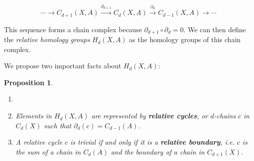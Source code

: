 \documentclass{amsart}
\newtheorem{proposition}[definition]{Proposition}
\begin{document}
\begin{equation}
\cdots \xrightarrow{} C_{d+1}(X,A) \xrightarrow{\partial_{d+1}} C_d(X,A) \xrightarrow{\partial_d} C_{d-1}(X,A) \rightarrow \cdots
\end{equation}

This sequence forms a chain complex because $\partial_{d+1}\circ\partial_{d} = 0$. We can then define the \emph{relative homology groups} $H_d(X,A)$ as the homology groups of this chain complex.

We propose two important facts about $H_d(X,A)$:

\begin{proposition}
\begin{enumerate}
	\item[]
	\item[1.] Elements in $H_d(X,A)$ are represented by \textbf{relative cycles}, or $d$-chains $c$ in $C_d(X)$ such that $\partial_d(c) = C_{d-1}(A)$.
	\item[2.] A relative cycle $c$ is trivial if and only if it is a \textbf{relative boundary}, i.e. $c$ is the sum of a chain in $C_d(A)$ and the boundary of a chain in $C_{d+1}(X)$.
\end{enumerate}
\end{proposition}
\end{document}
